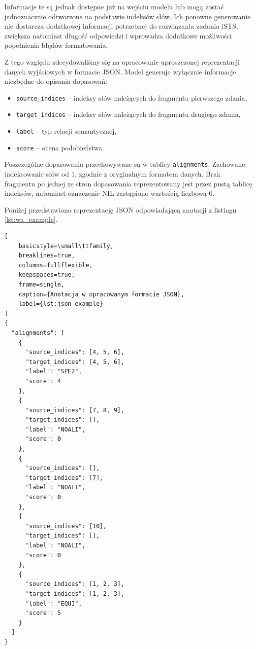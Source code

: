 \documentclass[a4paper,10pt]{article}
\begin{document}
Informacje te są jednak dostępne już na wejściu
modelu lub mogą zostać jednoznacznie odtworzone
na podstawie indeksów słów. Ich ponowne generowanie
nie dostarcza dodatkowej informacji potrzebnej
do rozwiązania zadania iSTS, zwiększa natomiast
długość odpowiedzi i wprowadza dodatkowe możliwości
popełnienia błędów formatowania.

Z tego względu zdecydowaliśmy się na opracowanie
uproszczonej reprezentacji danych wyjściowych
w formacie JSON. Model generuje wyłącznie informacje
niezbędne do opisania dopasowań:

\begin{itemize}
    \item \texttt{source\_indices} -- indeksy słów
    należących do fragmentu pierwszego zdania,

    \item \texttt{target\_indices} -- indeksy słów
    należących do fragmentu drugiego zdania,

    \item \texttt{label} -- typ relacji semantycznej,

    \item \texttt{score} -- ocena podobieństwa.
\end{itemize}

Poszczególne dopasowania przechowywane są w tablicy
\texttt{alignments}. Zachowano indeksowanie słów od 1,
zgodnie z oryginalnym formatem danych. Brak fragmentu
po jednej ze stron dopasowania reprezentowany jest
przez pustą tablicę indeksów, natomiast oznaczenie NIL
zastąpiono wartością liczbową 0.

Poniżej przedstawiono reprezentację JSON odpowiadającą
anotacji z listingu \ref{lst:wa_example}.

\begin{lstlisting}[
    basicstyle=\small\ttfamily,
    breaklines=true,
    columns=fullflexible,
    keepspaces=true,
    frame=single,
    caption={Anotacja w opracowanym formacie JSON},
    label={lst:json_example}
]
{
  "alignments": [
    {
      "source_indices": [4, 5, 6],
      "target_indices": [4, 5, 6],
      "label": "SPE2",
      "score": 4
    },
    {
      "source_indices": [7, 8, 9],
      "target_indices": [],
      "label": "NOALI",
      "score": 0
    },
    {
      "source_indices": [],
      "target_indices": [7],
      "label": "NOALI",
      "score": 0
    },
    {
      "source_indices": [10],
      "target_indices": [],
      "label": "NOALI",
      "score": 0
    },
    {
      "source_indices": [1, 2, 3],
      "target_indices": [1, 2, 3],
      "label": "EQUI",
      "score": 5
    }
  ]
}
\end{lstlisting}
\end{document}
